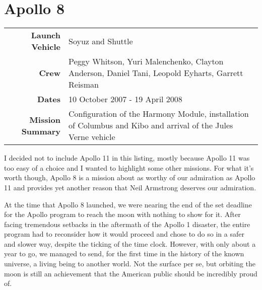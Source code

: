 \documentclass{article}
\begin{document}

  \section{Apollo 8}

  \begin{center}
    \begin{tabular}{ >{\bfseries}r | p{3.5in} }
      \hline
      Launch Vehicle & Soyuz and Shuttle \\
      Crew & Peggy Whitson, 
             Yuri Malenchenko, 
             Clayton Anderson, 
             Daniel Tani,
             Leopold Eyharts, 
             Garrett Reisman \\
      Dates & 10 October 2007 - 19 April 2008 \\
      Mission Summary & Configuration of the Harmony Module, installation of
      Columbus and Kibo and arrival of the Jules Verne vehicle \\
      \hline
    \end{tabular}
  \end{center}

  I decided not to include Apollo 11 in this listing, mostly because Apollo 11 was
  too easy of a choice and I wanted to highlight some other missions. For what
  it's worth though, Apollo 8 is a mission about as worthy of our admiration as
  Apollo 11 and provides yet another reason that Neil Armstrong deserves our
  admiration.

  At the time that Apollo 8 launched, we were nearing the end of the set deadline
  for the Apollo program to reach the moon with nothing to show for it. After
  facing tremendous setbacks in the aftermath of the Apollo 1 disaster, the entire
  program had to reconsider how it would proceed and chose to do so in a safer and
  slower way, despite the ticking of the time clock. However, with only about a
  year to go, we managed to send, for the first time in the history of the known
  universe, a living being to another world. Not the surface per se, but orbiting
  the moon is still an achievement that the American public should be incredibly
  proud of.

\end{document}
